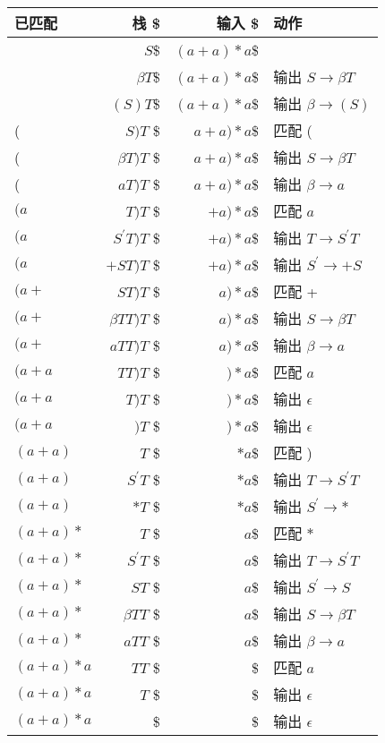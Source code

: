 \documentclass[12pt,a4paper]{article}
\newenvironment{problems}{\begin{list}{}{\renewcommand{\makelabel}[1]{\textbf{##1}\hfil}}}{\end{list}}
\begin{document}
\begin{problems}
        \begin{tabular}{|lr<{\$}r<{\$}l|}
            \hline
            已匹配   & 栈 & 输入 & 动作 \\
            \hline
             & $S$& $(a+a)*a$& \\
             & $\beta T$& $(a+a)*a$& 输出 $S \rightarrow \beta T$\\
             & $(S)T$& $(a+a)*a$& 输出 $\beta \rightarrow (S)$\\
            ( & $S)T$ & $a+a)*a$& 匹配 (\\
            ( & $\beta T)T$ & $a+a)*a$&输出 $S \rightarrow \beta T$\\
            ( & $aT)T$ & $a+a)*a$&输出 $\beta \rightarrow a$\\
            $(a$ & $T)T$ & $+a)*a$&匹配 $a$\\
            $(a$ & $S^\prime T)T$ & $+a)*a$&输出 $T \rightarrow S^\prime T$\\
            $(a$ & $+ST)T$ & $+a)*a$&输出 $S^\prime \rightarrow +S$\\
            $(a+$ & $ST)T$ & $a)*a$&匹配 +\\
            $(a+$ & $\beta TT)T$ & $a)*a$&输出 $S \rightarrow \beta T$\\
            $(a+$ & $a TT)T$ & $a)*a$&输出 $\beta \rightarrow a$\\
            $(a+a$ & $TT)T$ & $)*a$&匹配 $a$\\
            $(a+a$ & $T)T$ & $)*a$&输出 $\epsilon$\\
            $(a+a$ & $)T$ & $)*a$&输出 $\epsilon$\\
            $(a+a)$ & $T$ & $*a$&匹配 )\\
            $(a+a)$ & $S^\prime T$ & $*a$&输出 $T \rightarrow S^\prime T$\\
            $(a+a)$ & $* T$ & $*a$&输出 $S^\prime\rightarrow *$\\
            $(a+a)*$ & $T$ & $a$&匹配 $*$\\
            $(a+a)*$ & $S^\prime T$ & $a$&输出 $T \rightarrow S^\prime T$\\
            $(a+a)*$ & $S T$ & $a$&输出 $S^\prime \rightarrow S$\\
            $(a+a)*$ & $\beta T T$ & $a$&输出 $S\rightarrow \beta T$\\
            $(a+a)*$ & $a T T$ & $a$&输出 $\beta \rightarrow a$\\
            $(a+a)*a$ & $ T T$ & &匹配 $a$\\
            $(a+a)*a$ & $  T$ & &输出 $\epsilon$\\
            $(a+a)*a$ &  & &输出 $\epsilon$\\
            \hline
        \end{tabular}
        

\end{problems}
\end{document}
